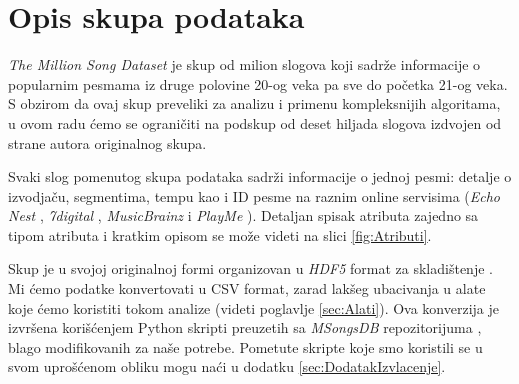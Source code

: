 \section{Opis skupa podataka}
\label{sec:Opis skupa podataka}

\emph{The Million Song Dataset} \cite{Dataset} je skup od milion slogova koji sadr\v{z}e informacije o popularnim pesmama iz druge polovine 20-og veka pa sve do po\v{c}etka 21-og veka. S obzirom da ovaj skup preveliki za analizu i primenu kompleksnijih algoritama, u ovom radu \'c{}emo se ograni\v{c}iti na podskup od deset hiljada slogova izdvojen od strane autora originalnog skupa.

Svaki slog pomenutog skupa podataka sadr\v{z}i informacije o jednoj pesmi: detalje o izvodja\v{c}u, segmentima, tempu kao i ID pesme na raznim online servisima (\emph{Echo Nest} \cite{EchoNest}, \emph{7digital} \cite{7digital},  \emph{MusicBrainz} \cite{MusicBrainz} i \emph{PlayMe} \cite{PlayMe}). Detaljan spisak atributa zajedno sa tipom atributa i kratkim opisom se mo\v{z}e videti na slici \ref{fig:Atributi}.

Skup je u svojoj originalnoj formi organizovan u \emph{HDF5} format za skladi\v{s}tenje \cite{HDF5}. Mi \'c{}emo podatke konvertovati u CSV format, zarad lak\v{s}eg ubacivanja u alate koje \'c{}emo koristiti tokom analize (videti poglavlje \ref{sec:Alati}). Ova konverzija je izvr\v{s}ena kori\v{s}\'c{}enjem Python skripti preuzetih sa \emph{MSongsDB} repozitorijuma \cite{MSongsDB}, blago modifikovanih za na\v{s}e potrebe. Pometute skripte koje smo koristili se u svom upro\v{s}\'c{}enom obliku mogu na\'c{}i u dodatku \ref{sec:DodatakIzvlacenje}.
